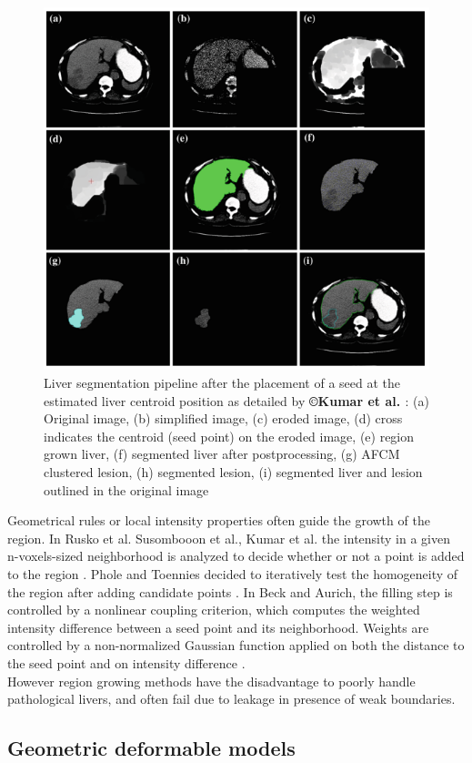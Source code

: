 \begin{figure}[ht!]
	\centering
	\includegraphics[width=0.7\linewidth]{images/Kumar2013_Fig5_v3}
	\caption{Liver segmentation pipeline after the placement of a seed at the estimated liver centroid position as detailed by \textbf{©Kumar et al. \cite{Kumar2013}}: (a) Original image, (b) simplified image, (c) eroded image, (d) cross indicates the centroid (seed point) on the eroded image, (e) region grown liver, (f) segmented liver after postprocessing, (g) AFCM clustered lesion, (h) segmented lesion, (i) segmented liver and lesion outlined in the original image}
	\label{Kumar2013_Fig5}
\end{figure}


Geometrical rules or local intensity properties often guide the growth
of the region. In Rusko et al. Susombooon et al., Kumar et al. the intensity in a given n-voxels-sized neighborhood is analyzed
to decide whether or not a point is added to the region \cite{Rusko2007, Susomboon2007, Kumar2013}. 
Phole and Toennies decided to iteratively test the homogeneity of the
region after adding candidate points \cite{Pohle2001}
. In Beck and Aurich, the filling step is controlled by a nonlinear
coupling criterion, which computes the weighted intensity difference
between a seed point and its neighborhood. Weights are controlled by a
non-normalized Gaussian function applied on both the distance to the
seed point and on intensity difference \cite{Beck2007}.\\
However region growing methods have the disadvantage to poorly handle
pathological livers, and often fail due to leakage in presence of weak
boundaries.


\subsection{Geometric deformable models}


